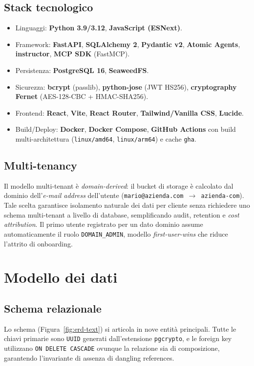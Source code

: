 \documentclass[11pt,a4paper,oneside]{article}
\begin{document}
\subsection{Stack tecnologico}
\begin{itemize}[leftmargin=*]
    \item Linguaggi: \textbf{Python 3.9/3.12}, \textbf{JavaScript (ESNext)}.
    \item Framework: \textbf{FastAPI}, \textbf{SQLAlchemy 2}, \textbf{Pydantic v2},
          \textbf{Atomic Agents}, \textbf{instructor}, \textbf{MCP SDK} (FastMCP).
    \item Persistenza: \textbf{PostgreSQL 16}, \textbf{SeaweedFS}.
    \item Sicurezza: \textbf{bcrypt} (passlib), \textbf{python-jose} (JWT
          \textsc{HS256}), \textbf{cryptography Fernet} (AES-128-CBC + HMAC-SHA256).
    \item Frontend: \textbf{React}, \textbf{Vite}, \textbf{React Router},
          \textbf{Tailwind/Vanilla CSS}, \textbf{Lucide}.
    \item Build/Deploy: \textbf{Docker}, \textbf{Docker Compose},
          \textbf{GitHub Actions} con build multi-architettura
          (\texttt{linux/amd64}, \texttt{linux/arm64}) e cache \texttt{gha}.
\end{itemize}

\subsection{Multi-tenancy}
Il modello multi-tenant \`e \emph{domain-derived}: il bucket di storage
\`e calcolato dal dominio dell'\emph{e-mail address} dell'utente
(\texttt{mario@azienda.com $\rightarrow$ azienda-com}). Tale scelta garantisce
isolamento naturale dei dati per cliente senza richiedere uno schema
multi-tenant a livello di database, semplificando audit, retention e
\emph{cost attribution}. Il primo utente registrato per un dato dominio assume
automaticamente il ruolo \texttt{DOMAIN\_ADMIN}, modello \emph{first-user-wins}
che riduce l'attrito di onboarding.

\section{Modello dei dati}

\subsection{Schema relazionale}
Lo schema (Figura~\ref{fig:erd-text}) si articola in nove entit\`a principali.
Tutte le chiavi primarie sono \texttt{UUID} generati dall'estensione
\texttt{pgcrypto}, e le foreign key utilizzano \texttt{ON DELETE CASCADE}
ovunque la relazione sia di composizione, garantendo l'invariante di assenza di
dangling references.
\end{document}

